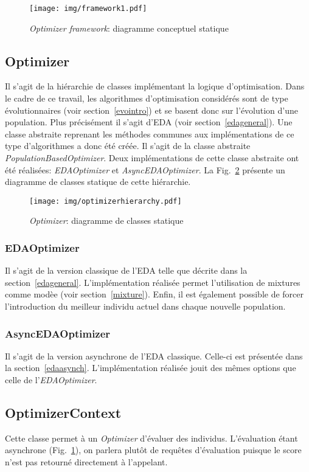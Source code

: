 \documentclass[a4paper, 11pt]{report}
\begin{document}
\begin{figure}[!h]
\centering
\texttt{[image: img/framework1.pdf]}
\caption{\textit{Optimizer framework}: diagramme conceptuel statique}
\label{framework1}
\end{figure}

\subsection{Optimizer}
Il s'agit de la hiérarchie de classes implémentant la logique d'optimisation. Dans le cadre de ce travail, les algorithmes d'optimisation considérés sont de type évolutionnaires (voir section~\ref{evointro}) et se basent donc sur l'évolution d'une population. Plus précisément il s'agit d'EDA (voir section~\ref{edageneral}). Une classe abstraite reprenant les méthodes communes aux implémentations de ce type d'algorithmes a donc été créée. Il s'agit de la classe abstraite \textit{PopulationBasedOptimizer}. Deux implémentations de cette classe abstraite ont été réalisées: \textit{EDAOptimizer} et \textit{AsyncEDAOptimizer}. La Fig.~\ref{optimizerhierarchy} présente un diagramme de classes statique de cette hiérarchie.

\begin{figure}[!h]
\centering
\texttt{[image: img/optimizerhierarchy.pdf]}
\caption{\textit{Optimizer}: diagramme de classes statique}
\label{optimizerhierarchy}
\end{figure}

\subsubsection{EDAOptimizer} 
Il s'agit de la version classique de l'EDA telle que décrite dans la section~\ref{edageneral}. L'implémentation réalisée permet l'utilisation de mixtures comme modèe (voir section~\ref{mixture}). Enfin, il est également possible de forcer l'introduction du meilleur individu actuel dans chaque nouvelle population.

\subsubsection{AsyncEDAOptimizer} 
Il s'agit de la version asynchrone de l'EDA classique. Celle-ci est présentée dans la section~\ref{edaasynch}. L'implémentation réalisée jouit des mêmes options que celle de l'\textit{EDAOptimizer}.  


\subsection{OptimizerContext}
\label{optimizecontextsection}
Cette classe permet à un \textit{Optimizer} d'évaluer des individus. L'évaluation étant asynchrone (Fig.~\ref{framework1}), on parlera plutôt de requêtes d'évaluation puisque le score n'est pas retourné directement à l'appelant.
\end{document}

